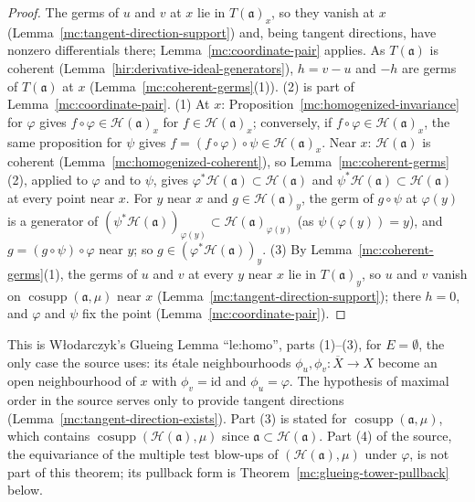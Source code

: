 \begin{proof}
\leanok
The germs of \(u\) and \(v\) at \(x\) lie in \(T(\mathfrak a)_x\), so they vanish at \(x\) (Lemma~\ref{mc:tangent-direction-support}) and, being tangent
directions, have nonzero differentials there; Lemma~\ref{mc:coordinate-pair} applies. As \(T(\mathfrak a)\) is coherent
(Lemma~\ref{hir:derivative-ideal-generators}), \(h=v-u\) and \(-h\) are germs of \(T(\mathfrak a)\) at \(x\) (Lemma~\ref{mc:coherent-germs}(1)).
(2) is part of Lemma~\ref{mc:coordinate-pair}.
(1) At \(x\): Proposition~\ref{mc:homogenized-invariance} for \(\varphi\) gives \(f\circ\varphi\in\mathcal H(\mathfrak a)_x\) for \(f\in\mathcal H(\mathfrak a)_x\);
conversely, if \(f\circ\varphi\in\mathcal H(\mathfrak a)_x\), the same proposition for \(\psi\) gives \(f=(f\circ\varphi)\circ\psi\in\mathcal H(\mathfrak a)_x\).
Near \(x\): \(\mathcal H(\mathfrak a)\) is coherent (Lemma~\ref{mc:homogenized-coherent}), so Lemma~\ref{mc:coherent-germs}(2), applied to \(\varphi\) and to
\(\psi\), gives \(\varphi^*\mathcal H(\mathfrak a)\subset\mathcal H(\mathfrak a)\) and \(\psi^*\mathcal H(\mathfrak a)\subset\mathcal H(\mathfrak a)\) at every point near \(x\).
For \(y\) near \(x\) and \(g\in\mathcal H(\mathfrak a)_y\), the germ of \(g\circ\psi\) at \(\varphi(y)\) is a generator of
\((\psi^*\mathcal H(\mathfrak a))_{\varphi(y)}\subset\mathcal H(\mathfrak a)_{\varphi(y)}\) (as \(\psi(\varphi(y))=y\)), and \(g=(g\circ\psi)\circ\varphi\) near \(y\);
so \(g\in(\varphi^*\mathcal H(\mathfrak a))_y\).
(3) By Lemma~\ref{mc:coherent-germs}(1), the germs of \(u\) and \(v\) at every \(y\) near \(x\) lie in \(T(\mathfrak a)_y\), so \(u\) and \(v\) vanish on
\(\operatorname{cosupp}(\mathfrak a,\mu)\) near \(x\) (Lemma~\ref{mc:tangent-direction-support}); there \(h=0\), and \(\varphi\) and \(\psi\) fix the point
(Lemma~\ref{mc:coordinate-pair}).
\end{proof}
This is Włodarczyk's Glueing Lemma ``le:homo'', parts (1)--(3), for \(E=\emptyset\), the only case the source uses: its étale neighbourhoods
\(\phi_u,\phi_v\colon\overline X\to X\) become an open neighbourhood of \(x\) with \(\phi_v=\mathrm{id}\) and \(\phi_u=\varphi\). The hypothesis of maximal
order in the source serves only to provide tangent directions (Lemma~\ref{mc:tangent-direction-exists}). Part (3) is stated for
\(\operatorname{cosupp}(\mathfrak a,\mu)\), which contains \(\operatorname{cosupp}(\mathcal H(\mathfrak a),\mu)\) since \(\mathfrak a\subset\mathcal H(\mathfrak a)\).
Part (4) of the source, the equivariance of the multiple test blow-ups of \((\mathcal H(\mathfrak a),\mu)\) under \(\varphi\), is not part of this theorem;
its pullback form is Theorem~\ref{mc:glueing-tower-pullback} below.


